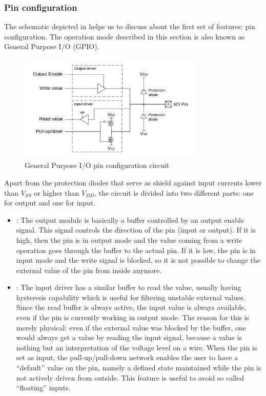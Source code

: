 \subsubsection{Pin configuration}
\label{sec:pinconf}

The schematic depicted in \myfig{\ref{fig:pinconf}} helps us to discuss about the first set of features: pin configuration.
The operation mode described in this section is also known as General Purpose I/O (GPIO).

\begin{figure}[h]
\centerline{\includegraphics[width=0.8\textwidth]{res/pinconf}}
\caption{General Purpose I/O pin configuration circuit \label{fig:pinconf}}
\end{figure}

Apart from the protection diodes that serve as shield against input currents lower than $V_{SS}$ or higher than $V_{DD}$,
the circuit is divided into two different parts: one for output and one for input.
\begin{itemize}
	\item {}:
		The output module is basically a buffer controlled by an output enable signal.
		This signal controls the direction of the pin (input or output). If it is high, then the pin is in output mode
		and the value coming from a write operation goes through the buffer to the actual pin.
		If it is low, the pin is in input mode and the write signal is blocked, so it is not possible to change the external value of the pin from inside anymore.
	\item {}:
		The input driver has a similar buffer to read the value, usually having hysteresis capability which is useful for filtering unstable external values.
		Since the read buffer is always active, the input value is always available, even if the pin is currently working in output mode.
		The reason for this is merely physical: even if the external value was blocked by the buffer,
		one would always get a value by reading the input signal, because a value is nothing but an interpretation of the voltage level on a wire.
		When the pin is set as input, the pull-up/pull-down network enables the user to have a ``default'' value on the pin,
		namely a defined state maintained while the pin is not actively driven from outside. This feature is useful to avoid so called ``floating'' inputs.
\end{itemize}

